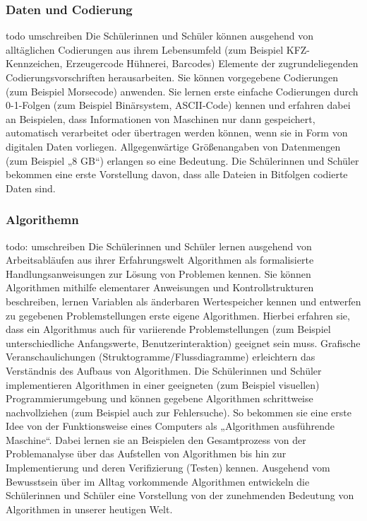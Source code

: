 \subsubsection{Daten und Codierung}
todo umschreiben
Die Schülerinnen und Schüler können ausgehend von alltäglichen Codierungen aus ihrem Lebensumfeld (zum Beispiel KFZ-Kennzeichen, Erzeugercode Hühnerei, Barcodes) Elemente der zugrundeliegenden Codierungsvorschriften herausarbeiten. Sie können vorgegebene Codierungen (zum Beispiel Morsecode) anwenden. Sie lernen erste einfache Codierungen durch 0-1-Folgen (zum Beispiel Binärsystem, ASCII-Code) kennen und erfahren dabei an Beispielen, dass Informationen von Maschinen nur dann gespeichert, automatisch verarbeitet oder übertragen werden können, wenn sie in Form von digitalen Daten vorliegen. Allgegenwärtige Größenangaben von Datenmengen (zum Beispiel „8 GB“) erlangen so eine Bedeutung. Die Schülerinnen und Schüler bekommen eine erste Vorstellung davon, dass alle Dateien in Bitfolgen codierte Daten sind\cite{Daten}.

\subsubsection{Algorithemn}
todo: umschreiben
Die Schülerinnen und Schüler lernen ausgehend von Arbeitsabläufen aus ihrer Erfahrungswelt Algorithmen als formalisierte Handlungsanweisungen zur Lösung von Problemen kennen. Sie können Algorithmen mithilfe elementarer Anweisungen und Kontrollstrukturen beschreiben, lernen Variablen als änderbaren Wertespeicher kennen und entwerfen zu gegebenen Problemstellungen erste eigene Algorithmen. Hierbei erfahren sie, dass ein Algorithmus auch für variierende Problemstellungen (zum Beispiel unterschiedliche Anfangswerte, Benutzerinteraktion) geeignet sein muss. Grafische Veranschaulichungen (Struktogramme/Flussdiagramme) erleichtern das Verständnis des Aufbaus von Algorithmen.
Die Schülerinnen und Schüler implementieren Algorithmen in einer geeigneten (zum Beispiel visuellen) Programmierumgebung und können gegebene Algorithmen schrittweise nachvollziehen (zum Beispiel auch zur Fehlersuche). So bekommen sie eine erste Idee von der Funktionsweise eines Computers als „Algorithmen ausführende Maschine“. Dabei lernen sie an Beispielen den Gesamtprozess von der Problemanalyse über das Aufstellen von Algorithmen bis hin zur Implementierung und deren Verifizierung (Testen) kennen.
Ausgehend vom Bewusstsein über im Alltag vorkommende Algorithmen entwickeln die Schülerinnen und Schüler eine Vorstellung von der zunehmenden Bedeutung von Algorithmen in unserer heutigen Welt\cite{Algo}.

